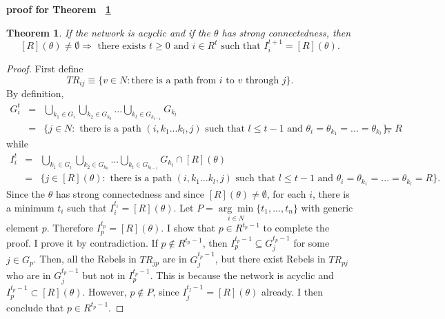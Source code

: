 \documentclass[12pt,letter]{article}
\newtheorem*{theorem*}{Theorem}
\theoremstyle{definition}
\theoremstyle{remark}
\theoremstyle{claim}
\begin{document}
%
%
%
\bigskip
\noindent\textbf{proof for Theorem ~\ref{lemma_empty}}
\begin{theorem*}
\label{lemma_empty}
If the network is acyclic and if the $\theta$ has strong connectedness, then 
\[[R](\theta)\neq \emptyset \Rightarrow \text{ there exists } t\geq 0 \text{ and } i\in R^t \text{ such that }I^{t+1}_i=[R](\theta).\] 
\end{theorem*}
\begin{proof}
First define
\[TR_{ij}\equiv \{v\in N:\text{there is a path from $i$ to $v$ through $j$}\}.\]
By definition, 
\begin{eqnarray*}
G^t_i & = & \bigcup_{k_1\in G_i}\bigcup_{k_2\in G_{k_0}}...\bigcup_{k_{t}\in G_{k_{t-1}}}G_{k_{t}}\\
&= & \{j\in N: \text{ there is a path $(i,k_1...k_{l},j)$ such that $l\leq t-1$ and $\theta_i=\theta_{k_1}=...=\theta_{k_l}=R$}\},
\end{eqnarray*}
while
\begin{eqnarray*}
I^t_i & = & \bigcup_{k_1\in G_i}\bigcup_{k_2\in G_{k_0}}...\bigcup_{k_{t}\in G_{k_{t-1}}}G_{k_{t}}\cap [R](\theta)\\
&= & \{j\in [R](\theta): \text{ there is a path $(i,k_1...k_{l},j)$ such that $l\leq t-1$ and $\theta_i=\theta_{k_1}=...=\theta_{k_l}=R$}\}.
\end{eqnarray*}
Since the $\theta$ has strong connectedness and since $[R](\theta)\neq \emptyset$, for each $i$, there is a minimum $t_i$ such that $I^{t_i}_i=[R](\theta)$. Let $P=\underset{i\in N}{\arg\min}\{t_1,...,t_n\}$ with generic element $p$. Therefore $I^{t_p}_p=[R](\theta)$. I show that $p\in R^{t_p-1}$ to complete the proof. I prove it by contradiction. If $p\notin R^{t_p-1}$, then $I^{t_p-1}_p\subseteq G^{t_p-1}_j$ for some $j\in G_p$. Then, all the Rebels in $TR_{jp}$ are in $G^{t_p-1}_j$, but there exist Rebels in $TR_{pj}$ who are in $G^{t_p-1}_j$ but not in $I^{t_p-1}_p$. This is because the network is acyclic and $I^{t_p-1}_p\subset [R](\theta)$. However, $p\notin P$, since $I^{t_j-1}_j=[R](\theta)$ already. I then conclude that $p\in R^{t_p-1}$.

\end{proof}
\end{document}
